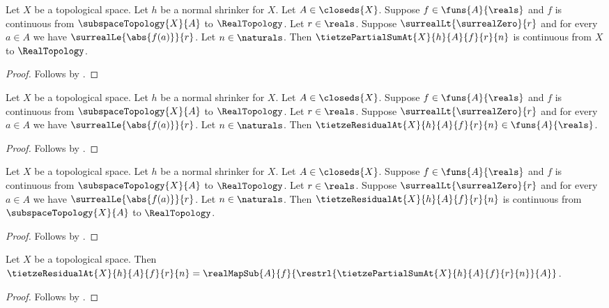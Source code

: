 \begin{corollary}\label{tietze_partial_sum_continuous}
    Let $X$ be a topological space.
    Let $h$ be a normal shrinker for $X$.
    Let $A\in\closeds{X}$.
    Suppose $f\in\funs{A}{\reals}$ and $f$ is continuous from
        $\subspaceTopology{X}{A}$ to $\RealTopology$.
    Let $r\in\reals$.
    Suppose $\surrealLt{\surrealZero}{r}$ and
        for every $a\in A$ we have $\surrealLe{\abs{f(a)}}{r}$.
    Let $n\in\naturals$.
    Then $\tietzePartialSumAt{X}{h}{A}{f}{r}{n}$ is continuous from
        $X$ to $\RealTopology$.
\end{corollary}
\begin{proof}
    Follows by
        .
\end{proof}

\begin{corollary}\label{tietze_residual_typed}
    Let $X$ be a topological space.
    Let $h$ be a normal shrinker for $X$.
    Let $A\in\closeds{X}$.
    Suppose $f\in\funs{A}{\reals}$ and $f$ is continuous from
        $\subspaceTopology{X}{A}$ to $\RealTopology$.
    Let $r\in\reals$.
    Suppose $\surrealLt{\surrealZero}{r}$ and
        for every $a\in A$ we have $\surrealLe{\abs{f(a)}}{r}$.
    Let $n\in\naturals$.
    Then $\tietzeResidualAt{X}{h}{A}{f}{r}{n}\in\funs{A}{\reals}$.
\end{corollary}
\begin{proof}
    Follows by
        .
\end{proof}

\begin{corollary}\label{tietze_residual_continuous}
    Let $X$ be a topological space.
    Let $h$ be a normal shrinker for $X$.
    Let $A\in\closeds{X}$.
    Suppose $f\in\funs{A}{\reals}$ and $f$ is continuous from
        $\subspaceTopology{X}{A}$ to $\RealTopology$.
    Let $r\in\reals$.
    Suppose $\surrealLt{\surrealZero}{r}$ and
        for every $a\in A$ we have $\surrealLe{\abs{f(a)}}{r}$.
    Let $n\in\naturals$.
    Then $\tietzeResidualAt{X}{h}{A}{f}{r}{n}$ is continuous from
        $\subspaceTopology{X}{A}$ to $\RealTopology$.
\end{corollary}
\begin{proof}
    Follows by
        .
\end{proof}

\begin{corollary}\label{tietze_residual_definition}
    Let $X$ be a topological space.
    Then
        $\tietzeResidualAt{X}{h}{A}{f}{r}{n}
            =\realMapSub{A}{f}
                {\restrl{\tietzePartialSumAt{X}{h}{A}{f}{r}{n}}{A}}$.
\end{corollary}
\begin{proof}
    Follows by .
\end{proof}

